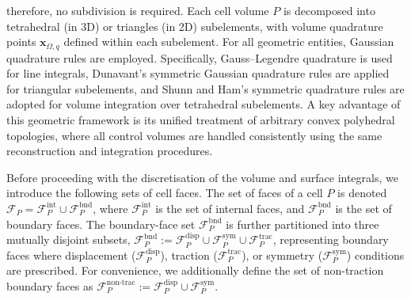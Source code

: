 \documentclass[review,3p]{elsarticle}
\newcommand{\bb}{\boldsymbol}
\begin{document}
therefore, no subdivision is required.
Each cell volume $P$ is decomposed into tetrahedral
(in 3D) or triangles (in 2D) subelements, with volume quadrature points $\bb{x}_{\Omega,q}$ defined within each subelement.
For all geometric entities, Gaussian quadrature rules are employed.
Specifically, Gauss–Legendre quadrature is used for line integrals,
Dunavant’s symmetric Gaussian quadrature rules \cite{Dunavant1985} are applied for triangular subelements,
and Shunn and Ham’s symmetric quadrature rules \cite{Shunn2012} are adopted for volume integration over tetrahedral subelements.
A key advantage of this geometric framework is its unified treatment of arbitrary convex polyhedral topologies, where all control
volumes are handled consistently using the same reconstruction and integration procedures.

Before proceeding with the discretisation of the volume and surface integrals, we introduce the following sets of cell faces.
The set of faces of a cell $P$ is denoted $\mathcal{F}_P=\mathcal{F}^{\text{int}}_P \cup \mathcal{F}^{\text{bnd}}_P$, 
where $\mathcal{F}_P^{\text{int}}$ is the set of internal faces, and $\mathcal{F}_P^{\text{bnd}}$ is the set of boundary faces.
The boundary-face set $\mathcal{F}_P^{\text{bnd}}$ is further partitioned into three mutually disjoint subsets,
$\mathcal{F}_P^{\mathrm{bnd}} := \mathcal{F}_P^{\text{disp}} \cup \mathcal{F}_P^{\text{sym}} \cup \mathcal{F}_P^{\text{trac}}$,
representing boundary faces where displacement ($\mathcal{F}_P^{\text{disp}}$), traction ($\mathcal{F}_P^{\text{trac}}$),
or symmetry ($\mathcal{F}_P^{\text{sym}}$) conditions are prescribed. For convenience, we additionally define the set of non-traction boundary faces as $\mathcal{F}_P^{\text{non-trac}} := \mathcal{F}_P^{\text{disp}} \cup \mathcal{F}_P^{\text{sym}}$.
%
\end{document}
